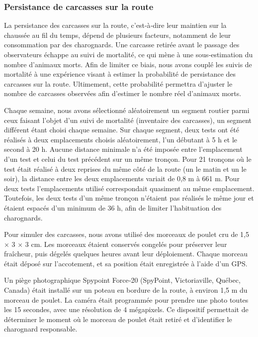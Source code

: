 



\subsubsection{Persistance de carcasses sur la route}

La persistance des carcasses sur la route, c'est‑à‑dire leur maintien sur la chaussée au fil du temps, dépend de plusieurs facteurs, notamment de leur consommation par des charognards. Une carcasse retirée avant le passage des observateurs échappe au suivi de mortalité, ce qui mène à une sous‑estimation du nombre d'animaux morts. Afin de limiter ce biais, nous avons couplé les suivis de mortalité à une expérience visant à estimer la probabilité de persistance des carcasses sur la route. Ultimement, cette probabilité permettra d'ajuster le nombre de carcasses observées afin d'estimer le nombre réel d'animaux morts.

Chaque semaine, nous avons sélectionné aléatoirement un segment routier parmi ceux faisant l'objet d'un suivi de mortalité (inventaire des carcasses), un segment différent étant choisi chaque semaine. Sur chaque segment, deux tests ont été réalisés à deux emplacements choisis aléatoirement, l'un débutant à 5 h et le second à 20 h. Aucune distance minimale n'a été imposée entre l'emplacement d'un test et celui du test précédent sur un même tronçon. Pour 21 tronçons où le test était réalisé à deux reprises du même côté de la route (un le matin et un le soir), la distance entre les deux emplacements variait de 0,8 m à 661 m. Pour deux tests l'emplacements utilisé correspondait quasiment au même emplacement. Toutefois, les deux tests d'un même tronçon n'étaient pas réalisés le même jour et étaient espacés d'un minimum de 36 h, afin de limiter l'habituation des charognards.

Pour simuler des carcasses, nous avons utilisé des morceaux de poulet cru de 1,5 × 3 × 3 cm. Les morceaux étaient conservés congelés pour préserver leur fraîcheur, puis dégelés quelques heures avant leur déploiement. Chaque morceau était déposé sur l'accotement, et sa position était enregistrée à l'aide d'un GPS.

Un piège photographique Spypoint Force‑20 (SpyPoint, Victoriaville, Québec, Canada) était installé sur un poteau en bordure de la route, à environ 1,5 m du morceau de poulet. La caméra était programmée pour prendre une photo toutes les 15 secondes, avec une résolution de 4 mégapixels. Ce dispositif permettait de déterminer le moment où le morceau de poulet était retiré et d'identifier le charognard responsable.

